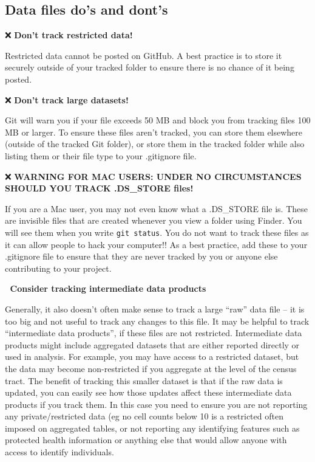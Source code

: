 \documentclass[
]{book}
\begin{document}
\subsection{Data files do's and dont's}\label{data-files-dos-and-donts}

❌ \textbf{Don't track restricted data!}

Restricted data cannot be posted on GitHub. A best practice is to store it
securely outside of your tracked folder to ensure there is no chance of it being
posted.

❌ \textbf{Don't track large datasets!}

Git will warn you if your file exceeds 50 MB and
block you from tracking files 100 MB or larger. To ensure these files aren't tracked, you can store them elsewhere (outside of
the tracked Git folder), or store them in the tracked folder while also listing them or their file type to your .gitignore file.

❌ \textbf{WARNING FOR MAC USERS: UNDER NO CIRCUMSTANCES SHOULD YOU TRACK .DS\_STORE files!}

If you are a Mac user, you may not even know what a .DS\_STORE file is. These are
invisible files that are created whenever you view a folder using Finder. You
will see them when you write \texttt{git\ status}. You do not want to track these files
as it can allow people to hack your computer!! As a best practice, add these
to your .gitignore file to ensure that they are never tracked by you or anyone
else contributing to your project.

🤔 \textbf{Consider tracking intermediate data products}

Generally, it also doesn't often make sense to track a large ``raw'' data file -- it is too big and not useful to track any changes to this file. It may be helpful to track ``intermediate data products'', if these files are not restricted. Intermediate data products might include aggregated datasets that are either reported directly or used in analysis. For example, you may have access to a restricted dataset, but the data may become non-restricted if you aggregate at the level of the census tract. The benefit of tracking this smaller dataset is that if the raw data is updated, you can easily see how those updates affect these intermediate data products if you track them. In this case you need to ensure you are not reporting any private/restricted data (eg no cell counts below 10 is a restricted often imposed on aggregated tables, or not reporting any identifying features such as protected health information or anything else that would allow anyone with access to identify
individuals.
\end{document}
